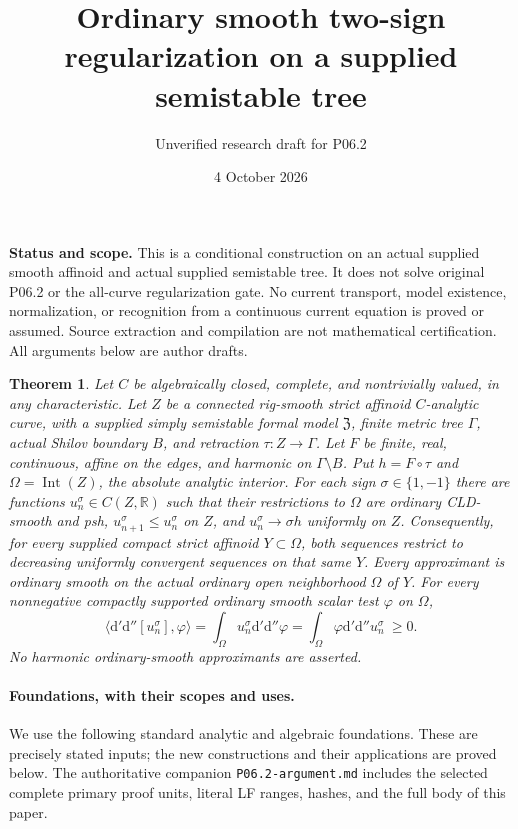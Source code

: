 \documentclass[11pt]{article}
\title{Ordinary smooth two-sign regularization on a supplied semistable tree}
\author{Unverified research draft for P06.2}
\date{4 October 2026}
\newtheorem{theorem}{Theorem}
\newcommand{\ddc}{\mathrm d'\mathrm d''}
\newcommand{\Int}{\operatorname{Int}}
\begin{document}
\maketitle

\noindent\textbf{Status and scope.}
This is a conditional construction on an actual supplied smooth affinoid
and actual supplied semistable tree. It does not solve original P06.2 or
the all-curve regularization gate. No current transport, model existence,
normalization, or recognition from a continuous current equation is proved
or assumed. Source extraction and compilation are not mathematical
certification. All arguments below are author drafts.

\begin{theorem}\label{thm:main}
Let $C$ be algebraically closed, complete, and nontrivially valued, in any
characteristic. Let $Z$ be a connected rig-smooth strict affinoid
$C$-analytic curve, with a supplied simply semistable formal model
$\mathfrak Z$, finite metric tree $\Gamma$, actual Shilov boundary $B$,
and retraction $\tau:Z\to\Gamma$. Let $F$ be finite, real, continuous,
affine on the edges, and harmonic on $\Gamma\setminus B$.
Put $h=F\circ\tau$ and $\Omega=\Int(Z)$, the absolute analytic interior.
For each sign $\sigma\in\{1,-1\}$ there are functions
$u_n^\sigma\in C(Z,\mathbb R)$ such that their restrictions to $\Omega$
are ordinary CLD-smooth and psh, $u_{n+1}^\sigma\leq u_n^\sigma$ on $Z$,
and $u_n^\sigma\to\sigma h$ uniformly on $Z$.
Consequently, for every supplied compact strict affinoid
$Y\subset\Omega$, both sequences restrict to decreasing uniformly
convergent sequences on that same $Y$. Every approximant is ordinary
smooth on the actual ordinary open neighborhood $\Omega$ of $Y$.
For every nonnegative compactly supported ordinary smooth scalar test
$\varphi$ on $\Omega$,
\[
 \langle\ddc[u_n^\sigma],\varphi\rangle
 =\int_\Omega u_n^\sigma\ddc\varphi
 =\int_\Omega\varphi\ddc u_n^\sigma\ \geq 0.
\]
No harmonic ordinary-smooth approximants are asserted.
\end{theorem}

\paragraph{Foundations, with their scopes and uses.}
We use the following standard analytic and algebraic foundations.
These are precisely stated inputs; the new constructions and their
applications are proved below. The authoritative companion
\texttt{P06.2-argument.md} includes the selected complete primary proof
units, literal LF ranges, hashes, and the full body of this paper.
\end{document}
